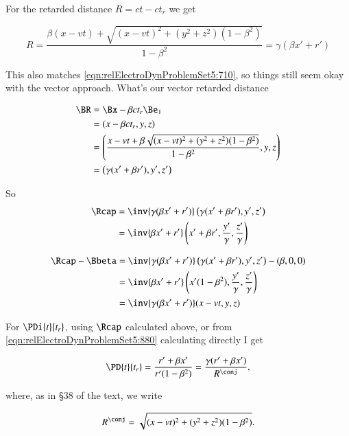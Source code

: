 For the retarded distance $R = ct - c t_r$ we get

\begin{equation}\label{eqn:relElectroDynProblemSet5:900}
R = \frac{ \beta( x - v t) + \sqrt{ (x- v t)^2 + (y^2 + z^2)(1-\beta^2) } }{ 1 - \beta^2 } = \gamma( \beta x' + r' )
\end{equation}

This also matches \ref{eqn:relElectroDynProblemSet5:710}, so things still seem okay with the vector approach.  What's our vector retarded distance

\begin{align*}
\BR 
&= \Bx - \beta c t_r \Be_1 \\
&= (x - \beta c t_r, y, z) \\
&= \left( \frac{ x - v t + \beta \sqrt{ (x- v t)^2 + (y^2 + z^2)(1-\beta^2) } }{ 1 - \beta^2 }, y, z \right) \\
&= \left( \gamma (x' + \beta r'), y', z' \right)
\end{align*}

So 
\begin{align*}
\Rcap 
&= \inv{ \gamma (\beta x' + r') } \left( \gamma(x' + \beta r'), y', z' \right) \\
&= \inv{ \beta x' + r' } \left( x' + \beta r', \frac{y'}{\gamma}, \frac{z'}{\gamma} \right)
\end{align*}

\begin{align*}
\Rcap -\Bbeta
&= \inv{ \gamma (\beta x' + r') } \left( \gamma(x' + \beta r'), y', z' \right) - (\beta, 0, 0) \\
&= \inv{ \beta x' + r' } \left( x'(1- \beta^2), \frac{y'}{\gamma}, \frac{z'}{\gamma} \right) \\
&= \inv{\gamma (\beta x' + r')} ( x - v t, y, z)
\end{align*}

For $\PDi{t}{t_r}$, using $\Rcap$ calculated above, or from \ref{eqn:relElectroDynProblemSet5:880} calculating directly I get

\begin{equation}\label{eqn:relElectroDynProblemSet5:920}
\PD{t}{t_r} = \frac{r' + \beta x'}{r'(1 - \beta^2)} = \frac{\gamma( r' + \beta x') }{R^\conj},
\end{equation}

where, as in \S 38 of the text, we write

\begin{equation}\label{eqn:relElectroDynProblemSet5:1020}
R^\conj = \sqrt{ (x - v t)^2 + (y^2 + z^2)(1-\beta^2) }.
\end{equation}

